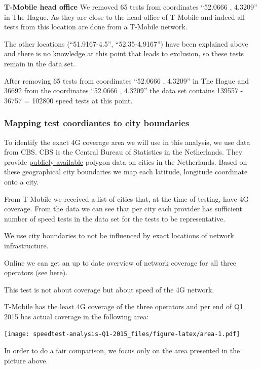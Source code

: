\documentclass[]{article}
\begin{document}
\textbf{T-Mobile head office} We removed 65 tests from coordinates
``52.0666 , 4.3209'' in The Hague. As they are close to the head-office
of T-Mobile and indeed all tests from this location are done from a
T-Mobile network.

The other locations (``51.9167-4.5'', ``52.35-4.9167'') have been
explained above and there is no knowledge at this point that leads to
exclusion, so these tests remain in the data set.

After removing 65 tests from coordinates ``52.0666 , 4.3209'' in The
Hague and 36692 from the coordinates ``52.0666 , 4.3209'' the data set
contains 139557 - 36757 = 102800 speed tests at this point.

\subsubsection{Mapping test coordiantes to city
boundaries}\label{mapping-test-coordiantes-to-city-boundaries}

To identify the exact 4G coverage area we will use in this analysis, we
use data from CBS. CBS is the Central Bureau of Statistics in the
Netherlands. They provide
\href{http://www.cbs.nl/nl-NL/menu/themas/dossiers/nederland-regionaal/publicaties/geografische-data/archief/2014/2013-wijk-en-buurtkaart-art.htm}{publicly
available} polygon data on cities in the Netherlands. Based on these
geographical city boundaries we map each latitude, longitude coordinate
onto a city.

From T-Mobile we received a list of cities that, at the time of testing,
have 4G coverage. From the data we can see that per city each provider
has sufficient number of speed tests in the data set for the tests to be
representative.

We use city boundaries to not be influenced by exact locations of
network infrastructure. \newpage

Online we can get an up to date overview of network coverage for all
three operators (see \href{http://www.4gdekking.nl/}{here}).

This test is not about coverage but about speed of the 4G network.

T-Mobile has the least 4G coverage of the three operators and per end of
Q1 2015 has actual coverage in the following area:

\texttt{[image: speedtest-analysis-Q1-2015\_files/figure-latex/area-1.pdf]}

In order to do a fair comparison, we focus only on the area presented in
the picture above.
\end{document}
